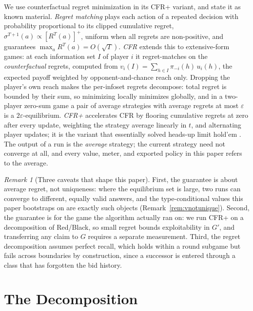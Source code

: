 \documentclass[11pt]{article}
\theoremstyle{plain}
\theoremstyle{definition}
\theoremstyle{remark}
\newtheorem{remark}[theorem]{Remark}
\newcommand{\reg}{\ensuremath{R}}
\newcommand{\infoset}{\ensuremath{I}}
\newcommand{\game}{\ensuremath{G}}
\newcommand{\gp}{\ensuremath{G'}}
\begin{document}
We use counterfactual regret minimization in its CFR+ variant, and state it as
known material. \emph{Regret matching} \cite{hart2000} plays each action of a
repeated decision with probability proportional to its clipped cumulative
regret, $\sigma^{T+1}(a) \propto [\reg^{T}(a)]^{+}$, uniform when all regrets
are non-positive, and guarantees $\max_a \reg^{T}(a) = O(\sqrt{T})$. \emph{CFR}
\cite{zinkevich2007} extends this to extensive-form games: at each information
set $\infoset$ of player $i$ it regret-matches on the \emph{counterfactual}
regrets, computed from $v_i(\infoset) = \sum_{h\in\infoset}\pi_{-i}(h)\,u_i(h)$,
the expected payoff weighted by opponent-and-chance reach only. Dropping the
player's own reach makes the per-infoset regrets decompose: total regret is
bounded by their sum, so minimizing locally minimizes globally, and in a
two-player zero-sum game a pair of average strategies with average regrets at
most $\varepsilon$ is a $2\varepsilon$-equilibrium. \emph{CFR+}
\cite{tammelin2014,tammelin2015} accelerates CFR by flooring cumulative regrets
at zero after every update, weighting the strategy average linearly in $t$, and
alternating player updates; it is the variant that essentially solved heads-up
limit hold'em \cite{bowling2015}. The output of a run is the \emph{average}
strategy; the current strategy need not converge at all, and every value, meter,
and exported policy in this paper refers to the average.

\begin{remark}[Three caveats that shape this paper]\label{rem:caveats}
First, the guarantee is about average regret, not uniqueness: where the
equilibrium set is large, two runs can converge to different, equally
valid answers, and the type-conditional values this paper bootstraps on
are exactly such objects (Remark~\ref{rem:vnotunique}). Second, the
guarantee is for the game the algorithm actually ran on: we run CFR+ on
a decomposition of Red/Black, so small regret bounds exploitability in
$\gp$, and transferring any claim to $\game$ requires a separate
measurement. Third, the regret decomposition assumes perfect recall,
which holds within a round subgame but fails across boundaries by
construction, since a successor is entered through a class that has
forgotten the bid history.
\end{remark}

\section{The Decomposition}\label{sec:decomp}
\end{document}
